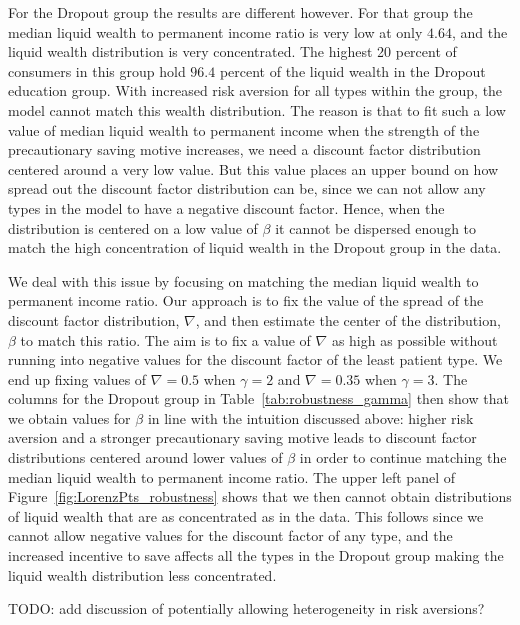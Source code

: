 \documentclass[../HAFiscal]{subfiles}
\begin{document}
For the Dropout group the results are different however. For that group the median liquid wealth to permanent income ratio is very low at only $4.64$, and the liquid wealth distribution is very concentrated. The highest 20 percent of consumers in this group hold $96.4$ percent of the liquid wealth in the Dropout education group. With increased risk aversion for all types within the group, the model cannot match this wealth distribution. The reason is that to fit such a low value of median liquid wealth to permanent income when the strength of the precautionary saving motive increases, we need a discount factor distribution centered around a very low value. But this value places an upper bound on how spread out the discount factor distribution can be, since we can not allow any types in the model to have a negative discount factor. Hence, when the distribution is centered on a low value of $\beta$ it cannot be dispersed enough to match the high concentration of liquid wealth in the Dropout group in the data. 

We deal with this issue by focusing on matching the median liquid wealth to permanent income ratio. Our approach is to fix the value of the spread of the discount factor distribution, $\nabla$, and then estimate the center of the distribution, $\beta$ to match this ratio. The aim is to fix a value of $\nabla$ as high as possible without running into negative values for the discount factor of the least patient type. We end up fixing values of $\nabla=0.5$ when $\gamma=2$ and $\nabla=0.35$ when $\gamma=3$. The columns for the Dropout group in Table~\ref{tab:robustness_gamma} then show that we obtain values for $\beta$ in line with the intuition discussed above: higher risk aversion and a stronger precautionary saving motive leads to discount factor distributions centered around lower values of $\beta$ in order to continue matching the median liquid wealth to permanent income ratio. The upper left panel of Figure~\ref{fig:LorenzPts_robustness} shows that we then cannot obtain distributions of liquid wealth that are as concentrated as in the data. This follows since we cannot allow negative values for the discount factor of any type, and the increased incentive to save affects all the types in the Dropout group making the liquid wealth distribution less concentrated. 

TODO: add discussion of potentially allowing heterogeneity in risk aversions? 
\end{document}
